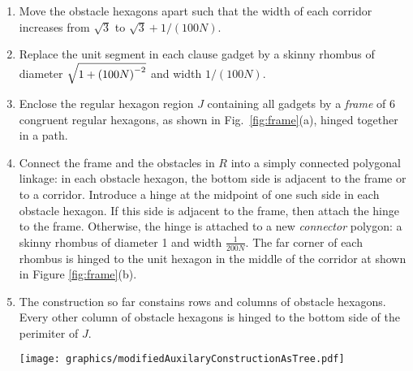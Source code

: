 \begin{enumerate}
\item Move the obstacle hexagons apart such that the width of each corridor increases from $\sqrt{3}$ to $\sqrt{3}+1/(100N)$.
\item Replace the unit segment in each clause gadget by a skinny rhombus of diameter $\sqrt{1 + \left( 100N \right)^{-2}}$ and width $1/(100N)$.
\item Enclose the regular hexagon region $J$ containing all gadgets by a \emph{frame} of 6 congruent regular hexagons, as shown in Fig.~\ref{fig:frame}(a), hinged together in a path.
%
%
\item Connect the frame and the obstacles in $R$ into a simply connected polygonal linkage: in each obstacle hexagon, the bottom side is adjacent to the frame or to a corridor. 
Introduce a hinge at the midpoint of one such side in each obstacle hexagon. 
If this side is adjacent to the frame, then attach the hinge to the frame. 
Otherwise, the hinge is attached to a new \emph{connector} polygon: a skinny rhombus of diameter 1 and width $\frac{1}{200N}$. 
The far corner of each rhombus is hinged to the unit hexagon in the middle of the corridor at shown in Figure \ref{fig:frame}(b).
\item The construction so far constains rows and columns of obstacle hexagons.
Every other column of obstacle hexagons is hinged to the bottom side of the perimiter of $J$.

\begin{minipage}{\linewidth}
\begin{center}
\texttt{[image: graphics/modifiedAuxilaryConstructionAsTree.pdf]}
\label{fig:modifiedAuxilaryConstructionAsTree.pdf}
\end{center}
\end{minipage}


\end{enumerate}
